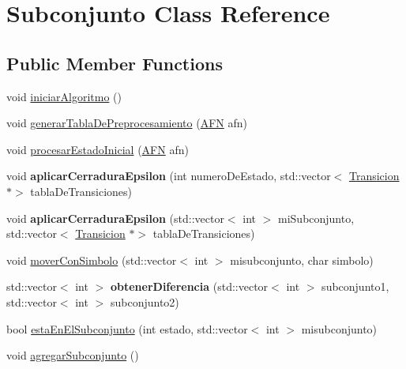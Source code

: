 \hypertarget{class_subconjunto}{}\section{Subconjunto Class Reference}
\label{class_subconjunto}
\subsection*{Public Member Functions}
\begin{DoxyCompactItemize}
\item 
void \hyperlink{class_subconjunto_aa8b327da2cfd9c8fb1d0b42edc737322}{iniciar\+Algoritmo} ()
\item 
void \hyperlink{class_subconjunto_a41444a0c990781527ae37a2e4374a516}{generar\+Tabla\+De\+Preprocesamiento} (\hyperlink{class_a_f_n}{A\+FN} afn)
\item 
void \hyperlink{class_subconjunto_a3b5add3ea0f5d4b11b226ffe18cbcbb0}{procesar\+Estado\+Inicial} (\hyperlink{class_a_f_n}{A\+FN} afn)
\item 
\mbox{\label{class_subconjunto_a1d606dfc6d781751d5d8bae5a9c7c034}} 
void {\bfseries aplicar\+Cerradura\+Epsilon} (int numero\+De\+Estado, std\+::vector$<$ \hyperlink{class_transicion}{Transicion} $\ast$$>$ tabla\+De\+Transiciones)
\item 
\mbox{\label{class_subconjunto_a3cec45a026be50b428bb6e5714312e86}} 
void {\bfseries aplicar\+Cerradura\+Epsilon} (std\+::vector$<$ int $>$ mi\+Subconjunto, std\+::vector$<$ \hyperlink{class_transicion}{Transicion} $\ast$$>$ tabla\+De\+Transiciones)
\item 
void \hyperlink{class_subconjunto_a790de92fb9aa30b0a93f280d33332fc5}{mover\+Con\+Simbolo} (std\+::vector$<$ int $>$ misubconjunto, char simbolo)
\item 
\mbox{\label{class_subconjunto_a425afd284437f9332252be1b06f13130}} 
std\+::vector$<$ int $>$ {\bfseries obtener\+Diferencia} (std\+::vector$<$ int $>$ subconjunto1, std\+::vector$<$ int $>$ subconjunto2)
\item 
bool \hyperlink{class_subconjunto_adb94befff9d815d5f05d4175a68b3371}{esta\+En\+El\+Subconjunto} (int estado, std\+::vector$<$ int $>$ misubconjunto)
\item 
void \hyperlink{class_subconjunto_a2d9a6c5c2296b12e57b1b16740a2477f}{agregar\+Subconjunto} ()

\end{DoxyCompactItemize}
